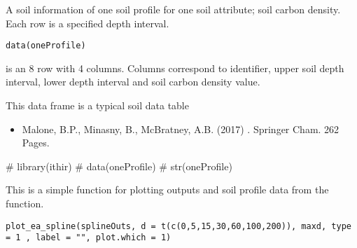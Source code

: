 \documentclass[a4paper]{book}
\begin{document}
%
\begin{Description}
A soil information  of one soil profile for one soil attribute; soil carbon density. Each row is a specified depth interval.
\end{Description}
%
\begin{Usage}
\begin{verbatim}
data(oneProfile)
\end{verbatim}
\end{Usage}
%
\begin{Format}
 is an 8 row  with 4 columns. Columns correspond to identifier, upper soil depth interval, lower depth interval and soil carbon density value. 
\end{Format}
%
\begin{Details}
This data frame is a typical soil data table
\end{Details}
%
\begin{References}
\begin{itemize}

\item{} Malone, B.P., Minasny, B., McBratney, A.B. (2017) . Springer Cham. 262 Pages.

\end{itemize}

\end{References}
%
\begin{Examples}
\begin{ExampleCode}

# library(ithir)
# data(oneProfile)
# str(oneProfile)

\end{ExampleCode}
\end{Examples}
%
\begin{Description}
This is a simple function for plotting outputs and soil profile data from the  function.
\end{Description}
%
\begin{Usage}
\begin{verbatim}
plot_ea_spline(splineOuts, d = t(c(0,5,15,30,60,100,200)), maxd, type = 1 , label = "", plot.which = 1)
\end{verbatim}
\end{Usage}
\end{document}

